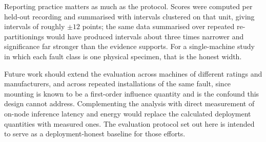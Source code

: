 Reporting practice matters as much as the protocol. Scores were computed per
held-out recording and summarised with intervals clustered on that unit, giving
intervals of roughly $\pm12$ points; the same data summarised over repeated
re-partitionings would have produced intervals about three times narrower and
significance far stronger than the evidence supports. For a single-machine study
in which each fault class is one physical specimen, that is the honest width.

Future work should extend the evaluation across machines of different ratings and
manufacturers, and across repeated installations of the same fault, since
mounting is known to be a first-order influence quantity and is the confound this
design cannot address. Complementing the analysis with direct measurement of
on-node inference latency and energy would replace the calculated deployment
quantities with measured ones. The evaluation protocol set out here is intended
to serve as a deployment-honest baseline for those efforts.
